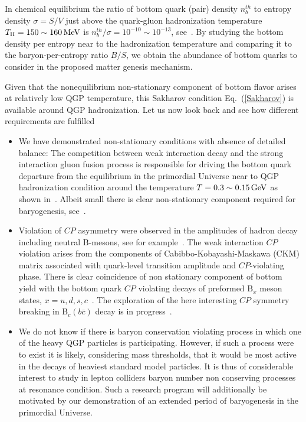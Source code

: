 In chemical equilibrium the ratio of bottom quark (pair) density $n_b^{th}$ to entropy density $\sigma=S/V$ just above the quark-gluon hadronization temperature $T_\mathrm{H}=150\sim160\text{\,MeV}$ is $n_b^{th}/\sigma=10^{-10}\sim 10^{-13}$, see~. By studying the bottom density per entropy near to the hadronization temperature and comparing it to the baryon-per-entropy ratio $B/S$, we obtain the abundance of bottom quarks to consider in the proposed matter genesis mechanism.

Given that the nonequilibrium non-stationary component of bottom flavor arises at relatively low QGP temperature, {\color{black}this Sakharov condition Eq.~(\ref{Sakharov}) is available around QGP hadronization.} Let us now look back and see how different requirements are fulfilled
\begin{itemize}
\item
 We have demonstrated non-stationary conditions with absence of detailed balance: The competition between weak interaction decay and the strong interaction gluon fusion process is responsible for driving the bottom quark departure from the equilibrium in the primordial Universe near to QGP hadronization condition around the temperature $T=0.3\sim0.15\text{\,GeV}$ as shown in~. Albeit small there is clear non-stationary component required for baryogenesis, see~.
\item Violation of $CP$ asymmetry were observed in the amplitudes of hadron decay including neutral B-mesons, see for example~\cite{LHCb:2019jta,LHCb:2020vut}. The weak interaction $CP$ violation arises from the components of Cabibbo-Kobayashi-Maskawa (CKM) matrix associated with quark-level transition amplitude and $CP$-violating phase. There is clear coincidence of non stationary component of bottom yield with the bottom quark $CP$ violating decays of preformed $\mathrm{B}_x$ meson states, $x=u,d,s,c$~\cite{Karsch:1987pv,Brambilla:2010vq,Aarts:2011sm,Brambilla:2017zei,Bazavov:2018wmo,Offler:2019eij}. The exploration of the here interesting $CP$ symmetry breaking in B$_c(b\bar c)$ decay is in progress~\cite{ParticleDataGroup:2022pth,Tully:2019ltb,HFLAV:2019otj}.
\item
We do not know if there is baryon conservation violating process in which one of the heavy QGP particles is participating. However, if such a process were to exist it is likely, considering mass thresholds, that it would be most active in the decays of heaviest standard model particles. It is thus of considerable interest to study in lepton colliders baryon number non conserving processes at resonance condition. Such a research program will additionally be motivated by our demonstration of an extended period of baryogenesis in the primordial Universe. 
\end{itemize}

